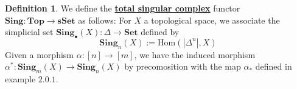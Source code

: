 \documentclass{article}
\theoremstyle{definition}
\theoremstyle{definition}
\newtheorem{definition}{Definition}[theorem]
\theoremstyle{definition}
\theoremstyle{definition}
\theoremstyle{definition}
\theoremstyle{definition}
\theoremstyle{definition}
\begin{document}
\begin{tcolorbox}[colback=purple!5!white,colframe=purple!75!black]
\begin{definition}
We define the \underline{\textbf{total singular complex}} functor $\textbf{Sing}: \textbf{Top}\to \textbf{sSet}$ as follows: For $X$ a topological space, we associate the simplicial set $\textbf{Sing}_{\bullet}(X): \Delta\to \textbf{Set}$ defined by
\[\textbf{Sing}_n(X):=\textrm{Hom}(|\Delta^n|,X)\]
Given a morphism $\alpha: [n]\to [m]$, we have the induced morphism $\alpha^*: \textbf{Sing}_m(X)\to \textbf{Sing}_n(X)$ by precomosition with the map $\alpha_*$ defined in example $2.0.1$. 
\end{definition}
\end{tcolorbox}
\end{document}
